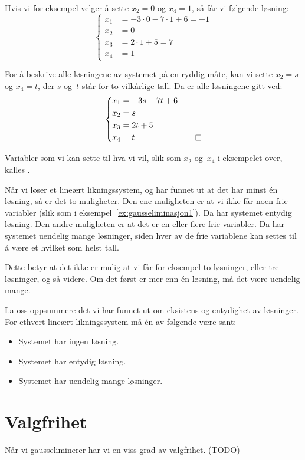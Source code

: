 \begin{ex}
Hvis vi for eksempel velger å sette $x_2 = 0$ og $x_4 = 1$, så får vi
følgende løsning:
\[
\left\{
\begin{aligned}
x_1 &= -3 \cdot 0 - 7 \cdot 1 + 6 = -1 \\
x_2 &= 0 \\
x_3 &= 2 \cdot 1 + 5 = 7 \\
x_4 &= 1
\end{aligned}
\right.
\]

For å beskrive alle løsningene av systemet på en ryddig måte, kan vi
sette $x_2 = s$ og $x_4 = t$, der $s$ og~$t$ står for to vilkårlige
tall.  Da er alle løsningene gitt ved:
\[
\raisebox{23pt}{$
\left\{
\begin{aligned}
x_1 &= -3 s - 7 t + 6 \\
x_2 &= s \\
x_3 &= 2 t + 5 \\
x_4 &= t
\end{aligned}
\right.
$}
\qedhere
\]
\end{ex}

Variabler som vi kan sette til hva vi vil, slik som $x_2$ og~$x_4$ i
eksempelet over, kalles .

Når vi løser et lineært likningssystem, og har funnet ut at det har
minst én løsning, så er det to muligheter.  Den ene muligheten er at
vi ikke får noen frie variabler (slik som i
eksempel~\ref{ex:gausseliminasjon1}).  Da har systemet entydig
løsning.  Den andre muligheten er at det er en eller flere frie
variabler.  Da har systemet uendelig mange løsninger, siden hver av de
frie variablene kan settes til å være et hvilket som helst tall.

Dette betyr at det ikke er mulig at vi får for eksempel to løsninger,
eller tre løsninger, og så videre.  Om det først er mer enn én
løsning, må det være uendelig mange.

\medskip

La oss oppsummere det vi har funnet ut om eksistens og entydighet av
løsninger.  For ethvert lineært likningssystem må én av følgende være
sant:
\begin{itemize}
\item Systemet har ingen løsning.
\item Systemet har entydig løsning.
\item Systemet har uendelig mange løsninger.
\end{itemize}


\section*{Valgfrihet}

Når vi gausseliminerer har vi en viss grad av valgfrihet.
(TODO)
